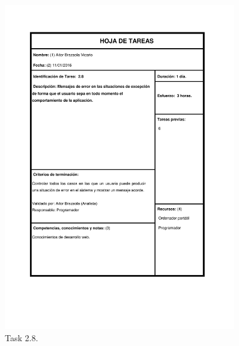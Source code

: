 \documentclass{DeustoFDP}
\begin{document}
\begin{figure}[H]
	\centering
	\includegraphics[width=0.9\textwidth]{fig/Tareas/28}
	\caption{Task 2.8.}
	\label{fig:t28}
\end{figure}
\end{document}

